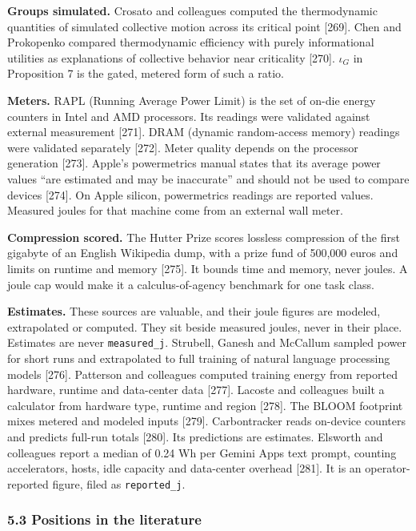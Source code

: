 \documentclass[
  10pt,
]{article}
\begin{document}
\textbf{Groups simulated.} Crosato and colleagues computed the
thermodynamic quantities of simulated collective motion across its
critical point {[}269{]}. Chen and Prokopenko compared thermodynamic
efficiency with purely informational utilities as explanations of
collective behavior near criticality {[}270{]}. \(\iota_G\) in
Proposition 7 is the gated, metered form of such a ratio.

\textbf{Meters.} RAPL (Running Average Power Limit) is the set of on-die
energy counters in Intel and AMD processors. Its readings were validated
against external measurement {[}271{]}. DRAM (dynamic random-access
memory) readings were validated separately {[}272{]}. Meter quality
depends on the processor generation {[}273{]}. Apple's powermetrics
manual states that its average power values ``are estimated and may be
inaccurate'' and should not be used to compare devices {[}274{]}. On
Apple silicon, powermetrics readings are reported values. Measured
joules for that machine come from an external wall meter.

\textbf{Compression scored.} The Hutter Prize scores lossless
compression of the first gigabyte of an English Wikipedia dump, with a
prize fund of 500,000 euros and limits on runtime and memory {[}275{]}.
It bounds time and memory, never joules. A joule cap would make it a
calculus-of-agency benchmark for one task class.

\textbf{Estimates.} These sources are valuable, and their joule figures
are modeled, extrapolated or computed. They sit beside measured joules,
never in their place. Estimates are never \texttt{measured\_j}.
Strubell, Ganesh and McCallum sampled power for short runs and
extrapolated to full training of natural language processing models
{[}276{]}. Patterson and colleagues computed training energy from
reported hardware, runtime and data-center data {[}277{]}. Lacoste and
colleagues built a calculator from hardware type, runtime and region
{[}278{]}. The BLOOM footprint mixes metered and modeled inputs
{[}279{]}. Carbontracker reads on-device counters and predicts full-run
totals {[}280{]}. Its predictions are estimates. Elsworth and colleagues
report a median of 0.24 Wh per Gemini Apps text prompt, counting
accelerators, hosts, idle capacity and data-center overhead {[}281{]}.
It is an operator-reported figure, filed as \texttt{reported\_j}.

\subsubsection{5.3 Positions in the
literature}\label{positions-in-the-literature-2}
\end{document}
